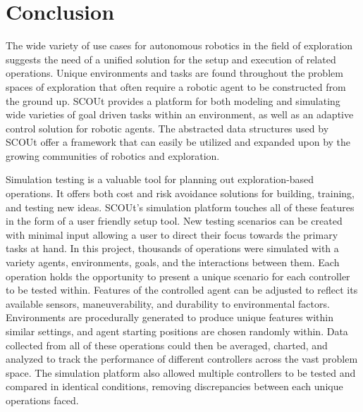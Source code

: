 

\chapter{Conclusion} \label{ch:conclusion}

The wide variety of use cases for autonomous robotics in the field of exploration suggests the need of a unified solution for the setup and execution of related operations.
Unique environments and tasks are found throughout the problem spaces of exploration that often require a robotic agent to be constructed from the ground up.
SCOUt provides a platform for both modeling and simulating wide varieties of goal driven tasks within an environment, as well as an adaptive control solution for robotic agents.
The abstracted data structures used by SCOUt offer a framework that can easily be utilized and expanded upon by the growing communities of robotics and exploration.

Simulation testing is a valuable tool for planning out exploration-based operations.
It offers both cost and risk avoidance solutions for building, training, and testing new ideas.
SCOUt's simulation platform touches all of these features in the form of a user friendly setup tool.
New testing scenarios can be created with minimal input allowing a user to direct their focus towards the primary tasks at hand.
In this project, thousands of operations were simulated with a variety agents, environments, goals, and the interactions between them.
Each operation holds the opportunity to present a unique scenario for each controller to be tested within.
Features of the controlled agent can be adjusted to reflect its available sensors, maneuverability, and durability to environmental factors.
Environments are procedurally generated to produce unique features within similar settings, and agent starting positions are chosen randomly within.
Data collected from all of these operations could then be averaged, charted, and analyzed to track the performance of different controllers across the vast problem space.
The simulation platform also allowed multiple controllers to be tested and compared in identical conditions, removing discrepancies between each unique operations faced.

